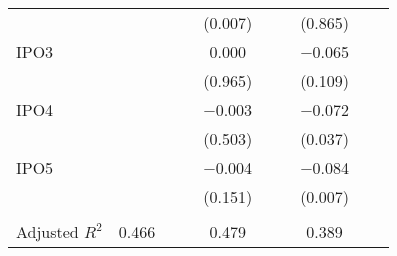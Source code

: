\begin{longtable}{l*{9}{c}}
                    &            &            &            &     (0.007)&            &            &     (0.865)&            &            \\
\addlinespace
IPO3                &            &            &            &       0.000&            &            &    $-$0.065&            &            \\
                    &            &            &            &     (0.965)&            &            &     (0.109)&            &            \\
\addlinespace
IPO4                &            &            &            &    $-$0.003&            &            &    $-$0.072&            &            \\
                    &            &            &            &     (0.503)&            &            &     (0.037)&            &            \\
\addlinespace
IPO5                &            &            &            &    $-$0.004&            &            &    $-$0.084&            &            \\
                    &            &            &            &     (0.151)&            &            &     (0.007)&            &            \\
\\
Adjusted $ R^{2}$   &       0.466&            &            &       0.479&            &            &       0.389&            &            \\
\bottomrule
\end{longtable}
